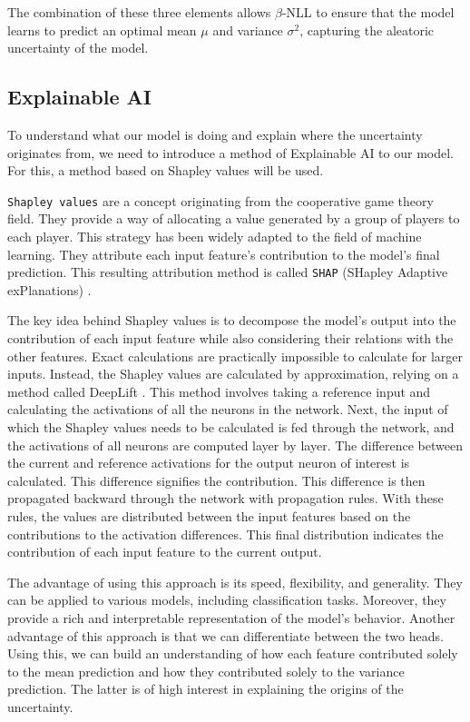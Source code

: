 The combination of these three elements allows $\beta$-NLL to ensure that the model learns to predict an optimal mean $\mu$ and variance $\sigma^2$, capturing the aleatoric uncertainty of the model.

\subsection{Explainable AI}

To understand what our model is doing and explain where the uncertainty originates from, we need to introduce a method of Explainable AI to our model. For this, a method based on Shapley values will be used.

\verb|Shapley values| are a concept originating from the cooperative game theory field. They provide a way of allocating a value generated by a group of players to each player. This strategy has been widely adapted to the field of machine learning. They attribute each input feature's contribution to the model's final prediction. This resulting attribution method is called \verb|SHAP| (SHapley Adaptive exPlanations) \citep{NIPS2017_7062}.

The key idea behind Shapley values is to decompose the model's output into the contribution of each input feature while also considering their relations with the other features. Exact calculations are practically impossible to calculate for larger inputs. Instead, the Shapley values are calculated by approximation, relying on a method called DeepLift \citep{shrikumar2017learning}. This method involves taking a reference input and calculating the activations of all the neurons in the network. Next, the input of which the Shapley values needs to be calculated is fed through the network, and the activations of all neurons are computed layer by layer. The difference between the current and reference activations for the output neuron of interest is calculated. This difference signifies the contribution. This difference is then propagated backward through the network with propagation rules. With these rules, the values are distributed between the input features based on the contributions to the activation differences. This final distribution indicates the contribution of each input feature to the current output. 

The advantage of using this approach is its speed, flexibility, and generality. They can be applied to various models, including classification tasks. Moreover, they provide a rich and interpretable representation of the model's behavior. Another advantage of this approach is that we can differentiate between the two heads. Using this, we can build an understanding of how each feature contributed solely to the mean prediction and how they contributed solely to the variance prediction. The latter is of high interest in explaining the origins of the uncertainty. 

